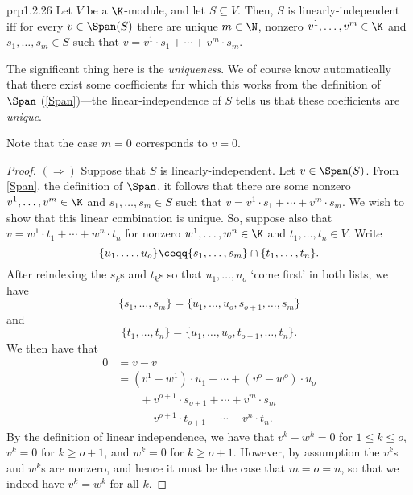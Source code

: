 \begin{prp}{}{prp1.2.26}
	Let $V$ be a $\K$-module, and let $S\subseteq V$.  Then, $S$ is linearly-independent iff for every $v\in \Span (S)$ there are unique $m\in \N$, nonzero $v^1,\ldots ,v^m\in \K$ and $s_1,\ldots ,s_m\in S$ such that $v=v^1\cdot s_1+\cdots +v^m\cdot s_m$.
	\begin{rmk}
		The significant thing here is the \emph{uniqueness}.  We of course know automatically that there exist some coefficients for which this works from the definition of $\Span$ (\cref{Span})---the linear-independence of $S$ tells us that these coefficients are \emph{unique}.
	\end{rmk}
	\begin{rmk}
		Note that the case $m=0$ corresponds to $v=0$.
	\end{rmk}
	\begin{proof}
		$(\Rightarrow )$ Suppose that $S$ is linearly-independent.  Let $v\in \Span (S)$.  From \cref{Span}, the definition of $\Span$, it follows that there are some nonzero $v^1,\ldots ,v^m\in \K$ and $s_1,\ldots ,s_m\in S$ such that $v=v^1\cdot s_1+\cdots +v^m\cdot s_m$.  We wish to show that this linear combination is unique.  So, suppose also that $v=w^1\cdot t_1+\cdots +w^n\cdot t_n$ for nonzero $w^1,\ldots ,w^n\in \K$ and $t_1,\ldots ,t_n\in V$.  Write
		\begin{equation}
		\{ u_1,\ldots ,u_o\} \ceqq \{ s_1,\ldots ,s_m\} \cap \{ t_1,\ldots ,t_n\} .
		\end{equation}
		After reindexing the $s_k$s and $t_k$s so that $u_1,\ldots ,u_o$ `come first' in both lists, we have
		\begin{equation}
		\{ s_1,\ldots ,s_m\} =\{ u_1,\ldots ,u_o,s_{o+1},\ldots ,s_m\}
		\end{equation}
		and
		\begin{equation}
		\{ t_1,\ldots ,t_n\} =\{ u_1,\ldots ,u_o,t_{o+1},\ldots ,t_n\} .
		\end{equation}
		We then have that
		\begin{equation}
		\begin{split}
		0 & =v-v \\
		& =(v^1-w^1)\cdot u_1+\cdots +(v^o-w^o)\cdot u_o \\ & \qquad +v^{o+1}\cdot s_{o+1}+\cdots +v^m\cdot s_m \\ & \qquad -v^{o+1}\cdot t_{o+1}-\cdots -v^n\cdot t_n.
		\end{split}
		\end{equation}
		By the definition of linear independence, we have that $v^k-w^k=0$ for $1\leq k\leq o$, $v^k=0$ for $k\geq o+1$, and $w^k=0$ for $k\geq o+1$.  However, by assumption the $v^k$s and $w^k$s are nonzero, and hence it must be the case that $m=o=n$, so that we indeed have $v^k=w^k$ for all $k$.
		

\end{proof}
\end{prp}
